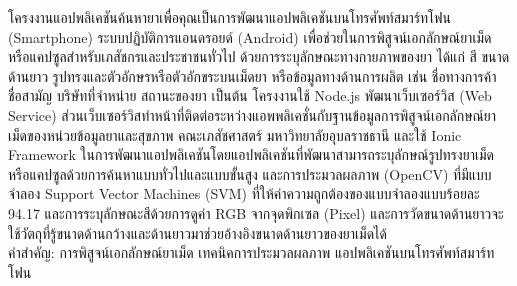 \begin{thaiabstract}
    โครงงานแอปพลิเคชันค้นหายาเพื่อคุณเป็นการพัฒนาแอปพลิเคชันบนโทรศัพท์สมาร์ทโฟน (Smartphone) 
    ระบบปฏิบัติการแอนดรอยด์ (Android) 
    เพื่อช่วยในการพิสูจน์เอกลักษณ์ยาเม็ดหรือแคปซูลสำหรับเภสัชกรและประชาชนทั่วไป 
    ด้วยการระบุลักษณะทางกายภาพของยา ได้แก่ สี ขนาดด้านยาว รูปทรงและตัวอักษรหรือตัวอักขระบนเม็ดยา 
    หรือข้อมูลทางด้านการผลิต เช่น ชื่อทางการค้า ชื่อสามัญ บริษัทที่จำหน่าย สถานะของยา เป็นต้น 
    โครงงานใช้ Node.js พัฒนาเว็บเซอร์วิส (Web Service) 
    ส่วนเว็บเซอร์วิสทำหน้าที่ติดต่อระหว่างแอพพลิเคชั่นกับฐานข้อมูลการพิสูจน์เอกลักษณ์ยาเม็ดของหน่วยข้อมูลยาและสุขภาพ 
    คณะเภสัชศาสตร์ มหาวิทยาลัยอุบลราชธานี 
    และใช้ Ionic Framework ในการพัฒนาแอปพลิเคชันโดยแอปพลิเคชันที่พัฒนาสามารถระบุลักษณ์รูปทรงยาเม็ดหรือแคปซูลด้วยการค้นหาแบบทั่วไปและแบบขั้นสูง
    และการประมวลผลภาพ (OpenCV) ที่มีแบบจำลอง Support Vector Machines (SVM) 
    ที่ให้ค่าความถูกต้องของแบบจำลองแบบร้อยละ 94.17 และการระบุลักษณะสีด้วยการดูค่า RGB จากจุดพิกเซล (Pixel) 
    และการวัดขนาดด้านยาวจะใช้วัตถุที่รู้ขนาดด้านกว้างและด้านยาวมาช่วยอ้างอิงขนาดด้านยาวของยาเม็ดได้
\noindent
\\คำสำคัญ: การพิสูจน์เอกลักษณ์ยาเม็ด เทคนิคการประมวลผลภาพ แอปพลิเคชันบนโทรศัพท์สมาร์ทโฟน
\end{thaiabstract}